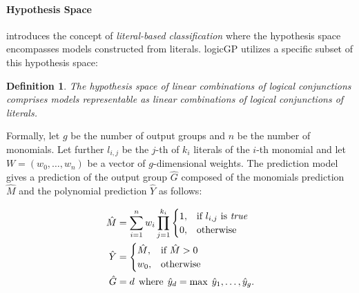 \documentclass[a4paper,twoside]{article}
\newtheorem{defn}{Definition}
\begin{document}
\paragraph{Hypothesis Space}

\citet{10.1145/3712255.3734300} introduces the concept of \emph{literal-based classification} where the hypothesis space encompasses models constructed from literals. logicGP utilizes a specific subset of this hypothesis space:

\begin{defn}
   The hypothesis space of \emph{linear combinations of logical conjunctions} comprises models representable as linear combinations of logical conjunctions of literals.
\end{defn}

Formally, let $g$ be the number of output groups and $n$ be the number of monomials. Let further $l_{i,j}$ be the $j$-th of $k_i$ literals of the $i$-th monomial and let $W=(w_0,\ldots,w_n)$ be a vector of $g$-dimensional weights. The prediction model gives a prediction of the output group $\hat{G}$ composed of the monomials prediction $\hat{M}$ and the polynomial prediction $\hat{Y}$ as follows:

\begin{equation*}
  \begin{split}
    \hat{M} &= \sum_{i=1}^{n} w_i \prod_{j=1}^{k_{i}} \begin{cases} 1, & \textrm{if
      } l_{i,j} \textrm{ is }\textit{true}\\ 0, & \textrm{otherwise} \end{cases} \\
  \hat{Y} &= \begin{cases} \hat{M}, & \textrm{if
     } \hat{M} > 0 \\ w_0, & \textrm{otherwise} \end{cases}  \\ 
  \hat{G} &= d \hspace*{1ex} \text{where} \hspace*{1ex} \hat{y}_d = \text{max} \hspace*{1ex} {\hat{y}_1,\ldots,\hat{y}_g}.
  \end{split}
\end{equation*}
\end{document}
